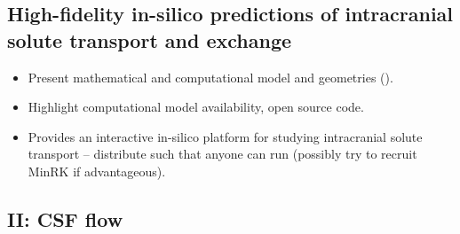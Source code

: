 \documentclass[fleqn,10pt]{wlscirep}
\newcommand{\draft}[1]{\textcolor{gray}{#1}}
\begin{document}
\subsection*{High-fidelity in-silico predictions of intracranial solute transport and exchange}

\begin{itemize}
\item
  Present mathematical and computational model and geometries (). 
\item
  Highlight computational model availability, open source code.
\item
  Provides an interactive in-silico platform for studying intracranial solute transport -- distribute such that anyone can run (possibly try to recruit MinRK if advantageous).
\end{itemize}

\draft{\lipsum[1]}

\subsection*{II: CSF flow}
\end{document}
